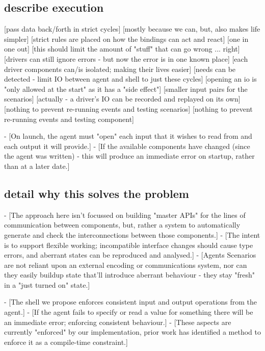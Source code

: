 \subsection{describe execution}

[pass data back/forth in strict cycles]
    [mostly because we can, but, also makes life simpler]
    [strict rules are placed on how the bindings can act and react]
        [one in one out]
    [this should limit the amount of "stuff" that can go wrong ... right]
        [drivers can still ignore errors - but now the error is in one known place]
    [each driver components can/is isolated; making their lives easier]
[needs can be detected - limit IO between agent and shell to just these cycles]
    [opening an io is "only allowed at the start" as it has a "side effect"]
    [smaller input pairs for the scenarios]
        [actually - a driver's IO can be recorded and replayed on its own]
    [nothing to prevent re-running events and testing scenarios]
    [nothing to prevent re-running events and testing component]

    - [On launch, the agent must "open" each input that it wishes to read from and each output it will provide.]
        - [If the available components have changed (since the agent was written) - this will produce an immediate error on startup, rather than at a later date.]



\subsection{detail why this solves the problem}

- [The approach here isn't focussed on building "master APIs" for the lines of communication between components, but, rather a system to automatically generate and check the interconnections between those components.]
    - [The intent is to support flexible working; incompatible interface changes should cause type errors, and aberrant states can be reproduced and analysed.]
- [Agents Scenarios are not reliant upon an external encoding or communications system, nor can they easily buildup state that'll introduce aberrant behaviour - they stay "fresh" in a "just turned on" state.]

- [The shell we propose enforces consistent input and output operations from the agent.]
    - [If the agent fails to specify or read a value for something there will be an immediate error; enforcing consistent behaviour.]
- [These aspects are currently "enforced" by our implementation, prior work has identified a method to enforce it as a compile-time constraint.\cite{winograd2012wormholes}]

